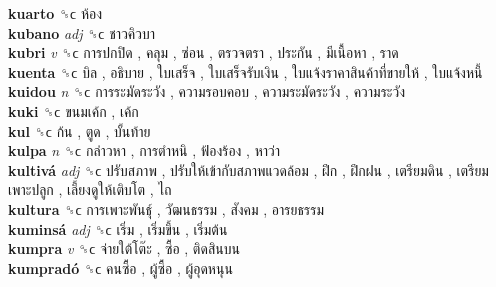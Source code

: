 \textbf{kuarto} ␝ϲ   ห้อง   \\
\textbf{kubano} \emph{adj}  ␝ϲ   ชาวคิวบา   \\
\textbf{kubri} \emph{v}  ␝ϲ   การปกปิด ,  คลุม ,  ซ่อน ,  ตรวจตรา ,  ประกัน ,  มีเนื้อหา ,  ราด   \\
\textbf{kuenta} ␝ϲ   บิล ,  อธิบาย ,  ใบเสร็จ ,  ใบเสร็จรับเงิน ,  ใบแจ้งราคาสินค้าที่ขายให้ ,  ใบแจ้งหนี้   \\
\textbf{kuidou} \emph{n}  ␝ϲ   การระมัดระวัง ,  ความรอบคอบ ,  ความระมัดระวัง ,  ความระวัง   \\
\textbf{kuki} ␝ϲ   ขนมเค้ก ,  เค้ก   \\
\textbf{kul} ␝ϲ   ก้น ,  ตูด ,  บั้นท้าย   \\
\textbf{kulpa} \emph{n}  ␝ϲ   กล่าวหา ,  การตำหนิ ,  ฟ้องร้อง ,  หาว่า   \\
\textbf{kultivá} \emph{adj}  ␝ϲ   ปรับสภาพ ,  ปรับให้เข้ากับสภาพแวดล้อม ,  ฝึก ,  ฝึกฝน ,  เตรียมดิน ,  เตรียมเพาะปลูก ,  เลี้ยงดูให้เติบโต ,  ไถ   \\
\textbf{kultura} ␝ϲ   การเพาะพันธุ์ ,  วัฒนธรรม ,  สังคม ,  อารยธรรม   \\
\textbf{kuminsá} \emph{adj}  ␝ϲ   เริ่ม ,  เริ่มขึ้น ,  เริ่มต้น   \\
\textbf{kumpra} \emph{v}  ␝ϲ   จ่ายใต้โต๊ะ ,  ซื้อ ,  ติดสินบน   \\
\textbf{kumpradó} ␝ϲ   คนซื้อ ,  ผู้ซื้อ ,  ผู้อุดหนุน   \\
